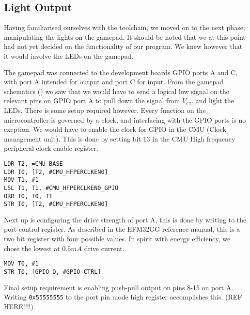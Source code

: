 \subsection{Light Output}
\label{sec:light-output}

Having familiarised ourselves with the toolchain, we moved on to the next phase; manipulating the lights on the gamepad. It should be noted that we at this point had not yet decided on the functionality of our program. We knew however that it would involve the LEDs on the gamepad.

The gamepad was connected to the development boards GPIO ports A and C, with port A intended for output and port C for input. From the gamepad schematics (\cite{compendium}) we saw that we would have to send a logical low signal on the relevant pins on GPIO port A to pull down the signal from $V_{CC}$ and light the LEDs. There is some setup required however. Every function on the microcontroller is governed by a clock, and interfacing with the GPIO ports is no exeption. We would have to enable the clock for GPIO in the CMU (Clock management unit). This is done by setting bit 13 in the CMU High frequency peripheral clock enable register.

\begin{lstlisting}[label=enable-gpio-clock,caption=Enabling GPIO clock in the CMU]
LDR T2, =CMU_BASE
LDR T0, [T2, #CMU_HFPERCLKEN0]
MOV T1, #1
LSL T1, T1, #CMU_HFPERCLKEN0_GPIO
ORR T0, T0, T1
STR T0, [T2, #CMU_HFPERCLKEN0]
\end{lstlisting}

Next up is configuring the drive strength of port A, this is done by writing to the port control register. As described in the EFM32GG reference manual, this is a two bit register with four possible values. In spirit with energy efficiency, we chose the lowest at $0.5mA$ drive current.

\begin{lstlisting}[label=set-drive-strength, caption= Set drive strength]
MOV T0, #1
STR T0, [GPIO_O, #GPIO_CTRL]
\end{lstlisting}

Final setup requirement is enabling push-pull output on pins 8-15 on port A. Writing \texttt{0x55555555} to the port pin mode high register accomplishes this. (REF HERE!!!!)

\begin{lstlisting}[label=enable-gpio-output, caption=Enable output]

\end{lstlisting}
